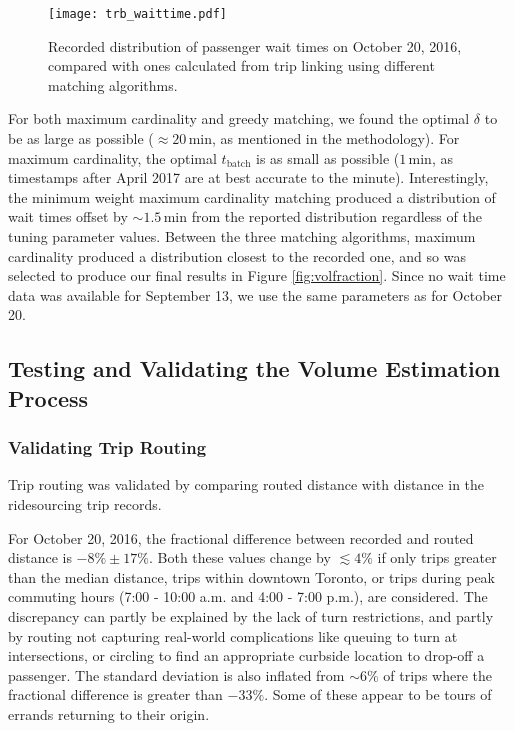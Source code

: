 \documentclass[]{trbunofficial_bdit_final}
\begin{document}
\begin{figure}
\centering
\texttt{[image: trb\_waittime.pdf]}
\caption{Recorded distribution of passenger wait times on October 20, 2016, compared
with ones calculated from trip linking using different matching algorithms.
\label{fig:waittime}}
\end{figure}

For both maximum cardinality and greedy matching, we found the optimal \(\delta\)
to be as large as possible (\(\approx20\,\mathrm{min}\), as mentioned in the
methodology). For maximum cardinality, the optimal \(t_\mathrm{batch}\) is as
small as possible (\(1\,\mathrm{min}\), as timestamps after April 2017 are at
best accurate to the minute). Interestingly, the minimum weight maximum
cardinality matching produced a distribution of wait times offset by
\(\sim1.5\,\mathrm{min}\) from the reported distribution regardless of the tuning
parameter values. Between the three matching algorithms, maximum
cardinality produced a distribution closest to the recorded one, and so was
selected to produce our final results in Figure \ref{fig:volfraction}. Since no
wait time data was available for September 13, we use the same parameters as
for October 20.

\hypertarget{testing-and-validating-the-volume-estimation-process}{%
\subsection{Testing and Validating the Volume Estimation Process}\label{testing-and-validating-the-volume-estimation-process}}

\hypertarget{validating-trip-routing}{%
\subsubsection{Validating Trip Routing}\label{validating-trip-routing}}

Trip routing was validated by comparing routed distance with distance in the
ridesourcing trip records.

For October 20, 2016, the fractional difference between recorded and
routed distance is \(-8\% \pm 17\%\). Both these values change by \(\lesssim4\%\)
if only trips greater than the median distance, trips within downtown Toronto,
or trips during peak commuting hours (7:00 - 10:00 a.m. and 4:00 - 7:00 p.m.),
are considered. The discrepancy can partly be explained by the lack of turn
restrictions, and partly by routing not capturing real-world complications like
queuing to turn at intersections, or circling to find an appropriate curbside
location to drop-off a passenger. The standard deviation is also inflated from
\(\sim6\%\) of trips where the fractional difference is greater than \(-33\%\).
Some of these appear to be tours of errands returning to their origin.
\end{document}
